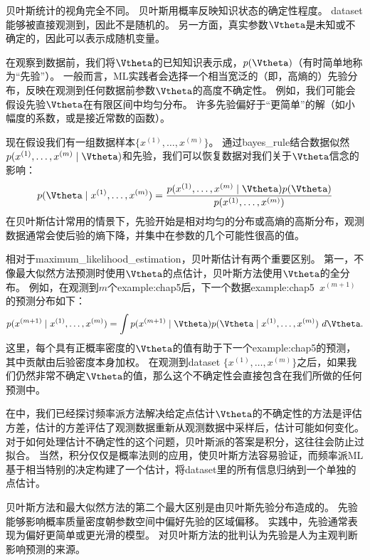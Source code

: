 贝叶斯统计的视角完全不同。
贝叶斯用概率反映知识状态的确定性程度。
\gls{dataset}能够被直接观测到，因此不是随机的。
另一方面，真实参数$\Vtheta$是未知或不确定的，因此可以表示成随机变量。

在观察到数据前，我们将$\Vtheta$的已知知识表示成，$p(\Vtheta)$（有时简单地称为``先验''）。
一般而言，\gls{ML}实践者会选择一个相当宽泛的（即，高熵的）先验分布，反映在观测到任何数据前参数$\Vtheta$的高度不确定性。
例如，我们可能会假设先验$\Vtheta$在有限区间中均匀分布。
许多先验偏好于``更简单''的解（如小幅度的系数，或是接近常数的函数）。

现在假设我们有一组数据样本$\{x^{(1)},\dots,x^{(m)}\}$。
通过\gls{bayes_rule}结合数据似然$p(x^{(1)},\dots,x^{(m)} \mid \Vtheta)$和先验，我们可以恢复数据对我们关于$\Vtheta$信念的影响：
\begin{equation}
        p(\Vtheta \mid x^{(1)},\dots,x^{(m)}) = 
        \frac{p(x^{(1)},\dots,x^{(m)} \mid \Vtheta) p(\Vtheta)}
            {p(x^{(1)},\dots,x^{(m)})}
\end{equation}
在贝叶斯估计常用的情景下，先验开始是相对均匀的分布或高熵的高斯分布，观测数据通常会使后验的熵下降，并集中在参数的几个可能性很高的值。

相对于\gls{maximum_likelihood_estimation}，贝叶斯估计有两个重要区别。
第一，不像最大似然方法预测时使用$\Vtheta$的点估计，贝叶斯方法使用$\Vtheta$的全分布。
例如，在观测到$m$个\gls{example:chap5}后，下一个数据\gls{example:chap5}~$x^{(m+1)}$的预测分布如下：
\begin{equation}
    p(x^{(m+1)} \mid x^{(1)},\dots,x^{(m)}) = 
    \int p(x^{(m+1)} \mid \Vtheta) p(\Vtheta \mid x^{(1)},\dots,x^{(m)})~d\Vtheta .
\end{equation}
这里，每个具有正概率密度的$\Vtheta$的值有助于下一个\gls{example:chap5}的预测，其中贡献由后验密度本身加权。
在观测到\gls{dataset} $\{ x^{(1)},\dots,x^{(m)}\}$之后，如果我们仍然非常不确定$\Vtheta$的值，那么这个不确定性会直接包含在我们所做的任何预测中。


在中，我们已经探讨频率派方法解决给定点估计$\Vtheta$的不确定性的方法是评估方差，估计的方差评估了观测数据重新从观测数据中采样后，估计可能如何变化。
对于如何处理估计不确定性的这个问题，贝叶斯派的答案是积分，这往往会防止过拟合。
当然，积分仅仅是概率法则的应用，使贝叶斯方法容易验证，而频率派\gls{ML}基于相当特别的决定构建了一个估计，将\gls{dataset}里的所有信息归纳到一个单独的点估计。

贝叶斯方法和最大似然方法的第二个最大区别是由贝叶斯先验分布造成的。
先验能够影响概率质量密度朝参数空间中偏好先验的区域偏移。
实践中，先验通常表现为偏好更简单或更光滑的模型。
对贝叶斯方法的批判认为先验是人为主观判断影响预测的来源。

